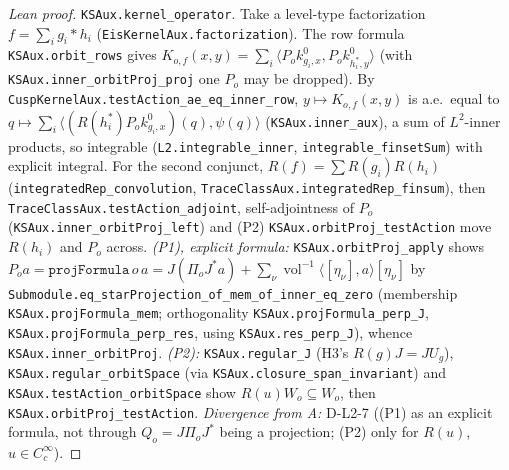 \begin{proof}[Lean proof]
\texttt{KSAux.kernel\_operator}. Take a level-type factorization $f=\sum_ig_i\ast h_i$ (\texttt{EisKernelAux.factorization}). The row formula \texttt{KSAux.orbit\_rows} gives $K_{o,f}(x,y)=\sum_i\langle P_ok^0_{g_i,x},P_ok^0_{h_i^*,y}\rangle$ (with \texttt{KSAux.inner\_orbitProj\_proj} one $P_o$ may be dropped). By \texttt{CuspKernelAux.testAction\_ae\_eq\_inner\_row}, $y\mapsto K_{o,f}(x,y)$ is a.e.\ equal to $q\mapsto\sum_i\langle(R(h_i^*)P_ok^0_{g_i,x})(q),\psi(q)\rangle$ (\texttt{KSAux.inner\_aux}), a sum of $L^2$-inner products, so integrable (\texttt{L2.integrable\_inner}, \texttt{integrable\_finsetSum}) with explicit integral. For the second conjunct, $R(f)=\sum R(g_i)R(h_i)$ (\texttt{integratedRep\_convolution}, \texttt{TraceClassAux.integratedRep\_finsum}), then \texttt{TraceClassAux.testAction\_adjoint}, self-adjointness of $P_o$ (\texttt{KSAux.inner\_orbitProj\_left}) and (P2) \texttt{KSAux.orbitProj\_testAction} move $R(h_i)$ and $P_o$ across. \emph{(P1), explicit formula:} \texttt{KSAux.orbitProj\_apply} shows $P_oa=\texttt{projFormula}\,o\,a=J(\Pi_oJ^*a)+\sum_{\nu}\operatorname{vol}^{-1}\langle[\eta_\nu],a\rangle[\eta_\nu]$ by \texttt{Submodule.eq\_starProjection\_of\_mem\_of\_inner\_eq\_zero} (membership \texttt{KSAux.projFormula\_mem}; orthogonality \texttt{KSAux.projFormula\_perp\_J}, \texttt{KSAux.projFormula\_perp\_res}, using \texttt{KSAux.res\_perp\_J}), whence \texttt{KSAux.inner\_orbitProj}. \emph{(P2):} \texttt{KSAux.regular\_J} (H3's $R(g)J=JU_g$), \texttt{KSAux.regular\_orbitSpace} (via \texttt{KSAux.closure\_span\_invariant}) and \texttt{KSAux.testAction\_orbitSpace} show $R(u)W_o\subseteq W_o$, then \texttt{KSAux.orbitProj\_testAction}. \emph{Divergence from A:} D-L2-7 ((P1) as an explicit formula, not through $Q_o=J\Pi_oJ^*$ being a projection; (P2) only for $R(u)$, $u\in C_c^\infty$).
\end{proof}

